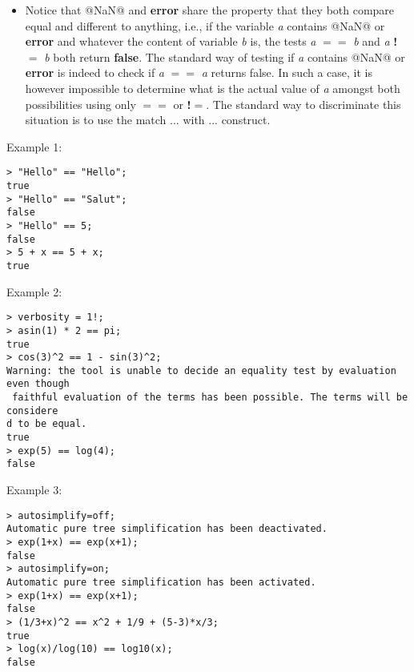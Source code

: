 \begin{itemize}
\item Notice that @NaN@ and \textbf{error} share the property that they both compare equal
   and different to anything, i.e., if the variable \emph{a} contains @NaN@ or \textbf{error}
   and whatever the content of variable \emph{b} is, the tests \emph{a} \textbf{$==$} \emph{b} and
   \emph{a} \textbf{!$=$} \emph{b} both return \textbf{false}. The standard way of testing if \emph{a} contains
   @NaN@ or \textbf{error} is indeed to check if \emph{a} \textbf{$==$} \emph{a} returns false. In such a
   case, it is however impossible to determine what is the actual value of \emph{a}
   amongst both possibilities using only \textbf{$==$} or \textbf{!$=$}. The standard way to
   discriminate this situation is to use the match ... with ... construct.
\end{itemize}
\noindent Example 1: 
\begin{center}\begin{minipage}{15cm}\begin{Verbatim}[frame=single]
> "Hello" == "Hello";
true
> "Hello" == "Salut";
false
> "Hello" == 5;
false
> 5 + x == 5 + x;
true
\end{Verbatim}
\end{minipage}\end{center}
\noindent Example 2: 
\begin{center}\begin{minipage}{15cm}\begin{Verbatim}[frame=single]
> verbosity = 1!;
> asin(1) * 2 == pi;
true
> cos(3)^2 == 1 - sin(3)^2;
Warning: the tool is unable to decide an equality test by evaluation even though
 faithful evaluation of the terms has been possible. The terms will be considere
d to be equal.
true
> exp(5) == log(4);
false
\end{Verbatim}
\end{minipage}\end{center}
\noindent Example 3: 
\begin{center}\begin{minipage}{15cm}\begin{Verbatim}[frame=single]
> autosimplify=off;
Automatic pure tree simplification has been deactivated.
> exp(1+x) == exp(x+1);
false
> autosimplify=on;
Automatic pure tree simplification has been activated.
> exp(1+x) == exp(x+1);
false
> (1/3+x)^2 == x^2 + 1/9 + (5-3)*x/3;
true
> log(x)/log(10) == log10(x);
false
\end{Verbatim}
\end{minipage}\end{center}
